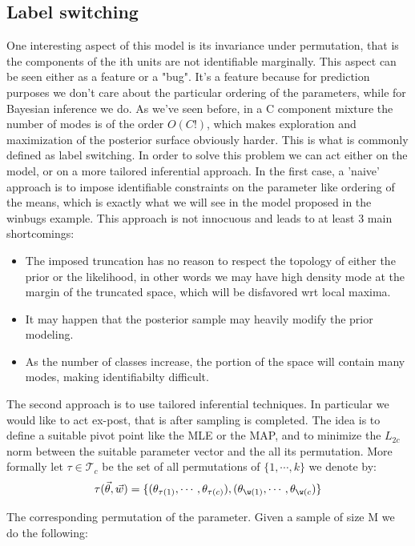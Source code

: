 \documentclass{article}
\begin{document}
\subsection{Label switching}
One interesting aspect of this model is its invariance under permutation, that is the components of the ith units are not identifiable marginally. This aspect can be seen either as a feature or a "bug". It's a feature because for prediction purposes we don't care about the particular ordering of the parameters, while for Bayesian inference we do. As we've seen before, in a C component mixture the number of modes is of the order $O(C!)$, which makes exploration and maximization of the posterior surface obviously harder. This is what is commonly defined as label switching.
In order to solve this problem we can act either on the model, or on a more tailored inferential approach. In the first case, a 'naive' approach is to impose identifiable constraints on the parameter like ordering of the means, which is exactly what we will see in the model proposed in the winbugs example. This approach is not innocuous and leads to at least 3 main shortcomings:
\begin{itemize}
\item  The imposed truncation has no reason to respect the topology of either the prior or the likelihood, in other words we may have high density mode at the margin of the truncated space, which will be disfavored wrt local maxima.
\item It may happen that the posterior sample may heavily modify the prior modeling. 
\item As the number of classes increase, the portion of the space will contain many modes, making identifiabilty difficult.
\end{itemize}
The second approach is to use tailored inferential techniques. In particular we would like to act ex-post, that is after sampling is completed. The idea is to define a suitable pivot point like the MLE or the MAP, and to minimize the $L_{2c}$ norm between the suitable parameter vector and the all its permutation. More formally let $\tau \in \mathcal{T}_c$ be the set of all permutations of $\{1, \cdots, k\}$ we denote by:
\begin{equation}
\tau (\vec \theta, \vec w) = \{ (\theta_{\tau(1)},\cdots, \theta_{\tau(c)}),(\theta_{\w(1)},\cdots, \theta_{\w(c}) \}
\end{equation}

The corresponding permutation of the parameter. Given a sample of size M we do the following:
\end{document}
